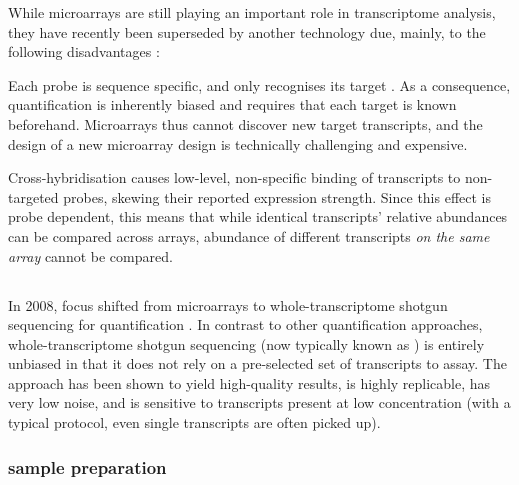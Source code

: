 While microarrays are still playing an important role in transcriptome analysis,
they have recently been superseded by another technology due, mainly, to the
following disadvantages \citep{Casneuf:2007,Marioni:2008}:
\begin{enumerate*}
    \item Each probe is sequence specific, and only recognises its target \mrna.
        As a consequence, quantification is inherently biased and requires that
        each target is known beforehand. Microarrays thus cannot discover new
        target transcripts, and the design of a new microarray design is
        technically challenging and expensive.
    \item Cross-hybridisation causes low-level, non-specific binding of
        transcripts to non-targeted probes, skewing their reported expression
        strength. Since this effect is probe dependent, this means that
        while identical transcripts’ relative abundances can be compared across
        arrays, abundance of different transcripts \emph{on the same array}
        cannot be compared.
    \item {}
    \item {}
\end{enumerate*}

\subsection{}

In 2008, focus shifted from microarrays to whole-transcriptome shotgun
sequencing for \rna quantification
\citep{Nagalakshmi:2008,Mortazavi:2008,Marioni:2008}. In contrast to other \rna
quantification approaches, whole-transcriptome shotgun sequencing (now typically
known as \rnaseq) is entirely unbiased in that it does not rely on a
pre-selected set of transcripts to assay.
The approach has been shown to yield
high-quality results, is highly replicable, has very low noise, and is sensitive
to transcripts present at low concentration (with a typical protocol, even
single transcripts are often picked up).

\subsubsection{ sample preparation}

